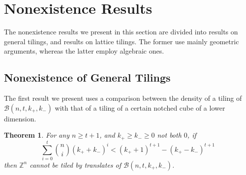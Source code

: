 \documentclass[sort&compress]{elsarticle}
\renewcommand{\geq}{\geqslant}
\newtheorem{theorem}{Theorem}
\newcommand{\Z}{\mathbb{Z}}
\newcommand{\kp}{k_+}
\newcommand{\km}{k_-}
\newcommand{\BALL}{{\mathcal B}(n,t,\kp,\km)}
\begin{document}
\section{Nonexistence Results}
\label{sec:notiling}

The nonexistence results we present in this section are divided into
results on general tilings, and results on lattice tilings. The former
use mainly geometric arguments, whereas the latter employ algebraic
ones.

\subsection{Nonexistence of General Tilings}

The first result we present uses a comparison between the density of a
tiling of $\BALL$ with that of a tiling of a certain notched cube of a
lower dimension.

\begin{theorem}
  \label{th:non1}
  For any $n\geq t+1$, and $\kp\geq \km\geq 0$ not both $0$, if
  \[\sum_{i=0}^t \binom{n}{i} (\kp+\km)^i <(\kp+1)^{t+1}-(\kp-\km)^{t+1}\]
  then $\Z^n$ cannot be tiled by translates of $\BALL$.
\end{theorem}
\end{document}
